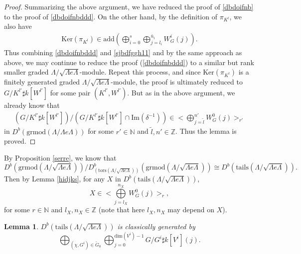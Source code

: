 \documentclass[11pt,reqno]{amsart}
\newtheorem{lemma}[theorem]{Lemma}
\theoremstyle{definition}
\begin{document}
\begin{proof}
Summarizing
the above argument, we have
reduced the proof of
\eqref{dbdoifnb}
to the proof of
\eqref{dbdoifnbddd}.
On the other hand, 
by the definition of $\pi_{K^l}$, 
we also have
\begin{align}\label{sjbdfggh11}
\mathrm{Ker}(\pi_{K^l}) \in \mathrm{add}
(\bigoplus_{i = 0}^{s} 
\bigoplus\limits_{j= l_i}^{\bar{n}_i} W_G^{i}(j)).
\end{align} 
Thus combining
\eqref{dbdoifnbddd} and \eqref{sjbdfggh11}
and by the same approach as above, we may
continue to
reduce the proof (\ref{dbdoifnbddd}) 
to a similar but rank smaller
graded $\Lambda / \sqrt{\Lambda e \Lambda}$-module. 
Repeat this process,
and since $\mathrm{Ker}(\pi_{K^l})$ is a finitely 
generated graded
$\Lambda / \sqrt{\Lambda e \Lambda}$-module, the proof
is ultimately reduced to
$G/K^{l'} \sharp 
k[W^{l'}]$ for some pair $(K^{l'}, W^{l'})$. 
But as in the above argument, we
already know that 
\begin{align*}%
(G/K^{l'} \sharp k[W^{l'}] ) / (G/K^{l'} \sharp k[W^{l'}]  
\cap \mathrm{Im}(\delta^{-1})) \in 
\big< \bigoplus\limits_{j= \tilde{l}}^{n'} W_G^{0}(j) \big>_{r'}
\end{align*}
in $D^{b}(\mathrm{grmod}(\Lambda / \Lambda e \Lambda) )$ for some 
$r' \in \mathbb{N}$ and $\tilde{l}, n' \in \mathbb{Z}$. 
Thus the lemma is proved.
\end{proof}

By Proposition \ref{serre}, we know that 
$$
D^{b}(\mathrm{grmod}(\Lambda / \sqrt{\Lambda e \Lambda}) 
) / D^{b}_{(\mathrm{tors}(\Lambda / \sqrt{\Lambda e \Lambda}) )}
(\mathrm{grmod}(\Lambda / \sqrt{\Lambda e \Lambda}) )    
\cong D^{b}(\mathrm{tails}(\Lambda / \sqrt{\Lambda e \Lambda}) ). 
$$ 
Then by Lemma \ref{hidjks},
for any $X$ in $D^{b}(\mathrm{tails}(\Lambda / \sqrt{\Lambda e \Lambda}) )$,
$$
X \in \big< \bigoplus\limits_{j= l_X}^{n_X} W_G^{0}(j) \big>_{r},
$$
for some $r \in \mathbb{N}$ and $l_X, n_X \in \mathbb{Z}$ (note that here
$l_X, n_X$ may depend on $X$). 


\begin{lemma}\label{mjdbck}
$D^{b}( \mathrm{tails}(\Lambda / \sqrt{\Lambda e \Lambda}) )$ is classically generated
by $$\bigoplus_{(\chi, G^i) \in \tilde{G}_0} 
\bigoplus_{j = 0}^{\mathrm{dim}(V^i) -1} G / G^i \sharp k[V^i](j).$$
\end{lemma}
\end{document}
